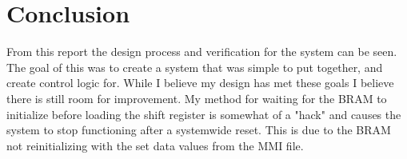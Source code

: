 \documentclass[11pt]{article}
\begin{document}
\section{Conclusion}
From this report the design process and verification for the system can be seen. The goal of this was to create a system that was simple to put together, and create control logic for. While I believe my design has met these goals I believe there is still room for improvement. My method for waiting for the BRAM to initialize before loading the shift register is somewhat of a "hack" and causes the system to stop functioning after a systemwide reset. This is due to the BRAM not reinitializing with the set data values from the MMI file.
\end{document}
